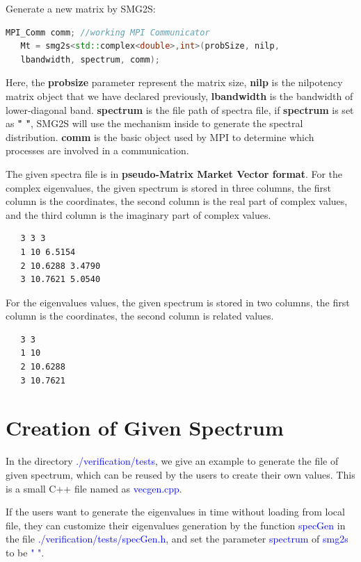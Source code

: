 \documentclass[a4paper, 10 pt]{report}
\begin{document}
	Generate a new matrix by SMG2S:

	\begin{lstlisting}[language=C++,frame=single]
   MPI_Comm comm; //working MPI Communicator
   Mt = smg2s<std::complex<double>,int>(probSize, nilp, 
   lbandwidth, spectrum, comm);
	\end{lstlisting}
	
	Here, the \textbf{probsize} parameter represent the matrix size, \textbf{nilp} is the nilpotency matrix object that we have declared previously, \textbf{lbandwidth} is the bandwidth of lower-diagonal band. \textbf{spectrum} is the file path of spectra file, if \textbf{spectrum} is set as \textbf{" "}, SMG2S will use the mechanism inside to generate the spectral distribution. \textbf{comm} is the basic object used by MPI to determine which processes are involved in a communication.
	
	The given spectra file is in \textbf{pseudo-Matrix Market Vector format}. For the complex eigenvalues, the given spectrum is stored in three columns, the first column is the coordinates, the second column is the real part of complex values, and the third column is the imaginary part of complex values.

	\begin{lstlisting}[language=bash,frame=single]
   %%MatrixMarket matrix coordinate complex general
   3 3 3
   1 10 6.5154
   2 10.6288 3.4790
   3 10.7621 5.0540
	\end{lstlisting}

For the eigenvalues values, the given spectrum is stored in two columns, the first column is the coordinates, the second column is related values.
	\begin{lstlisting}[language=bash,frame=single]
   %%MatrixMarket matrix coordinate complex general
   3 3
   1 10
   2 10.6288
   3 10.7621
\end{lstlisting}

\section{Creation of Given Spectrum}
In the directory \textcolor{blue}{./verification/tests}, we give an example to generate the file of given spectrum, which can be reused by the users to create their own values. This is a small C++ file named as \textcolor{blue}{vecgen.cpp}.

If the users want to generate the eigenvalues in time without loading from local file, they can customize their eigenvalues generation by the function \textcolor{blue}{specGen} in the file \textcolor{blue}{./verification/tests/specGen.h}, and set the parameter \textcolor{blue}{spectrum} of \textcolor{blue}{smg2s} to be \textcolor{blue}{" "}.
\end{document}
